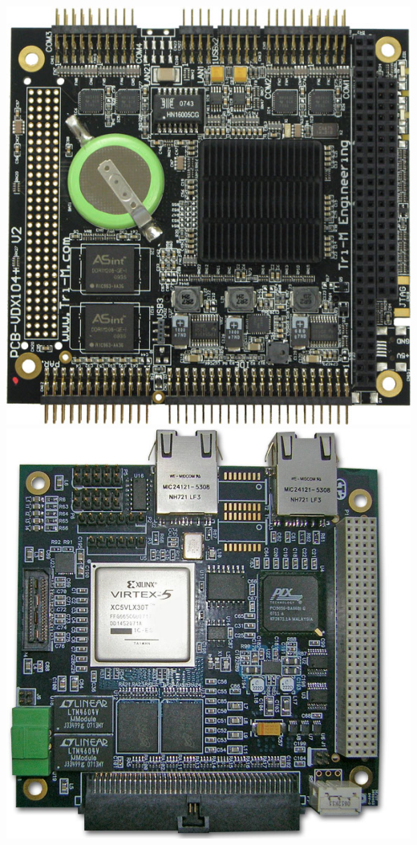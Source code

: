 \documentclass[landscape,xcolor={table},10pt]{beamer}
\begin{document}
\begin{frame}
\begin{columns}[T]
\begin{column}{.30\textwidth}
			\includegraphics[width=\textwidth]{images/vdx104} \\
			\includegraphics[width=\textwidth]{images/fpga}
					
		\end{column}%
		\end{columns}
			

	\end{frame}
	
\end{document}
